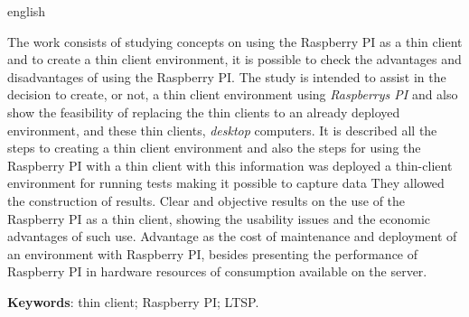 \documentclass[
	12pt,				%
	openright,			%
	twoside,			%
	a4paper,			%
	chapter=TITLE,		%
	english,			%
	brazil				%
	]{abntex2}
\begin{document}
\begin{resumo}[Abstract]
 \begin{otherlanguage*}{english}
   
   The work consists of studying concepts on using the Raspberry PI as a thin client and to create a thin client environment, it is possible to check the advantages and disadvantages of using the Raspberry PI. The study is intended to assist in the decision to create, or not, a thin client environment using \textit{Raspberrys PI} and also show the feasibility of replacing the thin clients to an already deployed environment, and these thin clients, \textit{desktop} computers. It is described all the steps to creating a thin client environment and also the steps for using the Raspberry PI with a thin client with this information was deployed a thin-client environment for running tests making it possible to capture data They allowed the construction of results. Clear and objective results on the use of the Raspberry PI as a thin client, showing the usability issues and the economic advantages of such use. Advantage as the cost of maintenance and deployment of an environment with Raspberry PI, besides presenting the performance of Raspberry PI in hardware resources of consumption available on the server.

   \vspace{\onelineskip}
 
   \noindent 
   \textbf{Keywords}: thin client; Raspberry PI; LTSP.
 \end{otherlanguage*}
\end{resumo}





\tableofcontents*
\cleardoublepage

\end{document}
